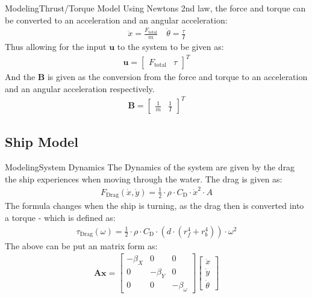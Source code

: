 \documentclass[10pt]{beamer}
\begin{document}
\begin{frame}{Modeling}{Thrust/Torque Model}
Using Newtons 2nd law, the force and torque can be converted to an acceleration and an angular acceleration:
\begin{align}
\ddot{x} = \frac{F_\text{total}}{m} \quad \ddot{\theta} = \frac{\tau}{I}
\end{align}
Thus allowing for the input $\mathbf{u}$ to the system to be given as:
\begin{align}
\mathbf{u} = \begin{bmatrix}
F_\text{total} & \tau
\end{bmatrix}^T
\end{align}
And the $\mathbf{B}$ is given as the conversion from the force and torque to an acceleration and an angular acceleration respectively.
\begin{align}
\mathbf{B} = \begin{bmatrix}
\frac{1}{m} & \frac{1}{I}
\end{bmatrix}^T
\end{align}
\end{frame}

\subsection{Ship Model}
\begin{frame}{Modeling}{System Dynamics}
The Dynamics of the system are given by the drag the ship experiences when moving through the water. The drag is given as:
\begin{align}
F_\text{Drag}(\dot{x},\dot{y}) = \frac{1}{2} \cdot \rho \cdot C_\text{D} \cdot \dot{x}^2 \cdot A 
\end{align}
The formula changes when the ship is turning, as the drag then is converted into a torque - which is defined as:
\begin{align}
\tau_\text{Drag}(\omega) = \frac{1}{2} \cdot \rho \cdot C_\text{D} \cdot (d \cdot (r_f^4 + r_b^4)) \cdot \omega^2
\end{align}
The above can be put an matrix form as:
\begin{align}
\mathbf{A}\mathbf{x} = \begin{bmatrix}
-\beta_X & 0 & 0\\
0 & -\beta_Y & 0\\
0 & 0 & -\beta_\omega
\end{bmatrix}\begin{bmatrix}
\dot{x}\\
\dot{y}\\
\dot{\theta}
\end{bmatrix}
\end{align}
\end{frame}
\end{document}
